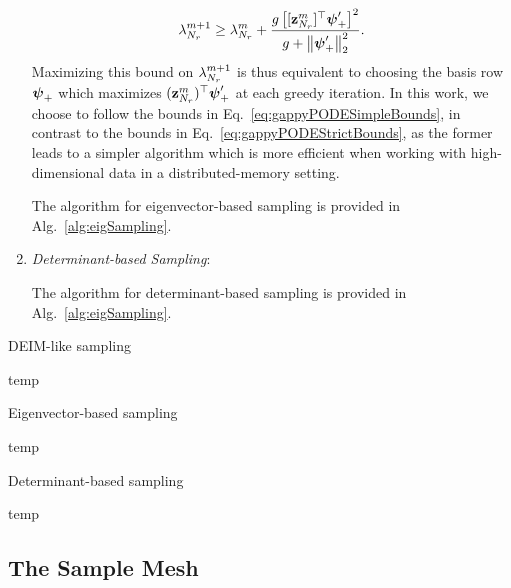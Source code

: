 \begin{enumerate}
	\begin{equation}\label{eq:gappyPODESimpleBounds}
		\lambda_{N_r}^{m+1} \ge \lambda_{N_r}^{m} + \frac{g \left[ [\mathbf{z}_{N_r}^{m}]^\top \boldsymbol{\psi}'_+ \right]^2}{g + \left\Vert \boldsymbol{\psi}'_+ \right\Vert_2^2}.
	\end{equation}
	Maximizing this bound on $\lambda_{N_r}^{m+1}$ is thus equivalent to choosing the basis row $\boldsymbol{\psi}_+$ which maximizes $(\mathbf{z}_{N_r}^{m})^\top \boldsymbol{\psi}'_+$ at each greedy iteration. In this work, we choose to follow the bounds in Eq.~\ref{eq:gappyPODESimpleBounds}, in contrast to the bounds in Eq.~\ref{eq:gappyPODEStrictBounds}, as the former leads to a simpler algorithm which is more efficient when working with high-dimensional data in a distributed-memory setting.

	The algorithm for eigenvector-based sampling is provided in Alg.~\ref{alg:eigSampling}.

	\item \textit{Determinant-based Sampling}:

	The algorithm for determinant-based sampling is provided in Alg.~\ref{alg:eigSampling}.

\end{enumerate}

\begin{algorithm}
	\caption{DEIM-like sampling}\label{alg:deimSampling}
	\begin{algorithmic}
		\STATE temp
	\end{algorithmic}
\end{algorithm}

\begin{algorithm}
    \caption{Eigenvector-based sampling}\label{alg:eigSampling}
    \begin{algorithmic}
		\STATE temp
    \end{algorithmic}
\end{algorithm}

\begin{algorithm}
    \caption{Determinant-based sampling}\label{alg:detSampling}
    \begin{algorithmic}
		\STATE temp
    \end{algorithmic}
\end{algorithm}

\subsection{The Sample Mesh}\label{subsec:sampleMesh}

